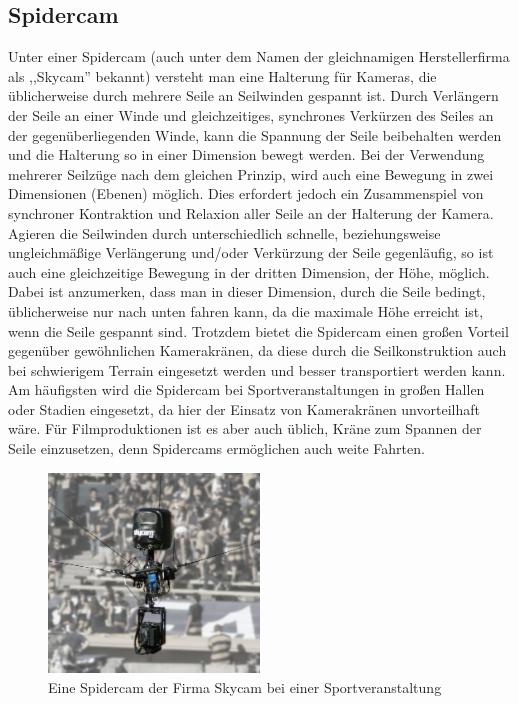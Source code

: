 \documentclass[a4paper, 12pt, bibtotocnumbered, liststotocnumbered]{scrartcl}
\begin{document}
	\subsection{Spidercam}
	Unter einer Spidercam (auch unter dem Namen der gleichnamigen Herstellerfirma als ,,Skycam” bekannt) versteht man eine Halterung für Kameras, die üblicherweise durch mehrere Seile an Seilwinden gespannt ist. Durch Verlängern der Seile an einer Winde und gleichzeitiges, synchrones Verkürzen des Seiles an der gegenüberliegenden Winde, kann die Spannung der Seile beibehalten werden und die Halterung so in einer Dimension bewegt werden. Bei der Verwendung mehrerer Seilzüge nach dem gleichen Prinzip, wird auch eine Bewegung in zwei Dimensionen (Ebenen) möglich. Dies erfordert jedoch ein Zusammenspiel von synchroner Kontraktion und Relaxion aller Seile an der Halterung der Kamera. Agieren die Seilwinden durch unterschiedlich schnelle, beziehungsweise ungleichmäßige Verlängerung und/oder Verkürzung der Seile gegenläufig, so ist auch eine gleichzeitige Bewegung in der dritten Dimension, der Höhe, möglich. Dabei ist anzumerken, dass man in dieser Dimension, durch die Seile bedingt, üblicherweise nur nach unten fahren kann, da die maximale Höhe erreicht ist, wenn die Seile gespannt sind. Trotzdem bietet die Spidercam einen großen Vorteil gegenüber gewöhnlichen Kamerakränen, da diese durch die Seilkonstruktion auch bei schwierigem Terrain eingesetzt werden und besser transportiert werden kann. Am häufigsten wird die Spidercam bei Sportveranstaltungen in großen Hallen oder Stadien eingesetzt, da hier der Einsatz von Kamerakränen unvorteilhaft wäre. Für Filmproduktionen ist es aber auch üblich, Kräne zum Spannen der Seile einzusetzen, denn Spidercams ermöglichen auch weite Fahrten.
	
	\begin{figure}[htb]
		\centering
		\includegraphics[width=0.5\textwidth]{Bilder/SkycamHDClipEnhanced0346}
		\caption{Eine Spidercam der Firma Skycam bei einer Sportveranstaltung}
	\end{figure}
\end{document}
